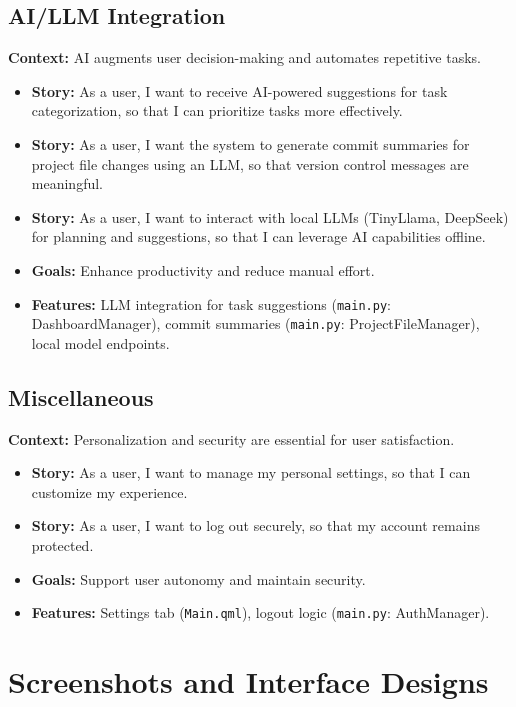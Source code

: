 \documentclass{report}
\begin{document}
\section{AI/LLM Integration}
\textbf{Context:} AI augments user decision-making and automates repetitive tasks.
\begin{itemize}
    \item \textbf{Story:} As a user, I want to receive AI-powered suggestions for task categorization, so that I can prioritize tasks more effectively.
    \item \textbf{Story:} As a user, I want the system to generate commit summaries for project file changes using an LLM, so that version control messages are meaningful.
    \item \textbf{Story:} As a user, I want to interact with local LLMs (TinyLlama, DeepSeek) for planning and suggestions, so that I can leverage AI capabilities offline.
    \item \textbf{Goals:} Enhance productivity and reduce manual effort.
    \item \textbf{Features:} LLM integration for task suggestions (\texttt{main.py}: DashboardManager), commit summaries (\texttt{main.py}: ProjectFileManager), local model endpoints.
\end{itemize}

\section{Miscellaneous}
\textbf{Context:} Personalization and security are essential for user satisfaction.
\begin{itemize}
    \item \textbf{Story:} As a user, I want to manage my personal settings, so that I can customize my experience.
    \item \textbf{Story:} As a user, I want to log out securely, so that my account remains protected.
    \item \textbf{Goals:} Support user autonomy and maintain security.
    \item \textbf{Features:} Settings tab (\texttt{Main.qml}), logout logic (\texttt{main.py}: AuthManager).
\end{itemize}

\chapter{Screenshots and Interface Designs}\label{UI}
\end{document}
